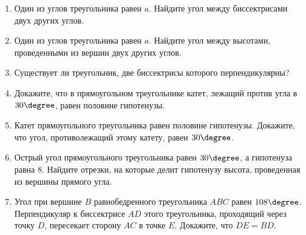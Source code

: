 \documentclass[12pt, a4paper]{article}
\begin{document}
		

\begin{enumerate}
	\item Один из углов треугольника равен $a$. Найдите угол между биссектрисами двух других углов.
	\item Один из углов треугольника равен $a$. Найдите угол между высотами, проведенными из вершин двух других углов.
	\item Существует ли треугольник, две биссектрисы которого перпендикулярны?
	\item Докажите, что в прямоугольном треугольнике катет, лежащий против угла в $30\degree$, равен половине гипотенузы.
	\item Катет прямоугольного треугольника равен половине гипотенузы. Докажите, что угол, противолежащий этому катету, равен $30\degree$.
	\item Острый угол прямоугольного треугольника равен $30\degree$, а гипотенуза равна $8$. Найдите отрезки, на которые делит гипотенузу высота, проведенная из вершины прямого угла.
	\item Угол при вершине $B$ равнобедренного треугольника $ABC$ равен $108\degree$. Перпендикуляр к биссектрисе $AD$ этого треугольника, проходящий через точку $D$, пересекает сторону $AC$ в точке $E$. Докажите, что $DE = BD$.
\end{enumerate}
\end{document}
